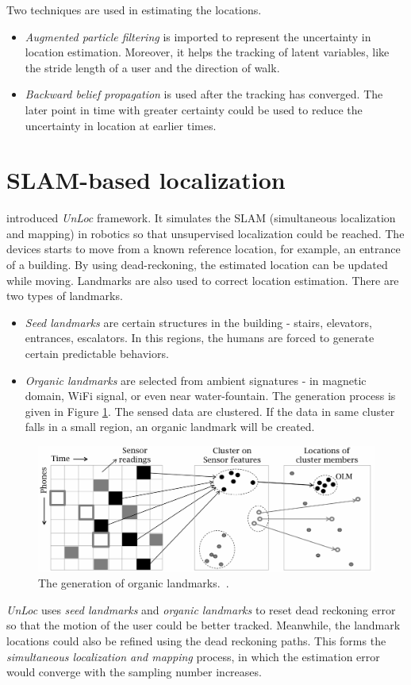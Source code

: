 \documentclass[letterpaper]{article}
\begin{document}
Two techniques are used in estimating the locations.
\begin{itemize}
\item \emph{Augmented particle filtering} is imported to represent the uncertainty in location estimation.
Moreover, it helps the tracking of latent variables, like the stride length of a user and the direction of walk.
\item \emph{Backward belief propagation} is used after the tracking has converged.
The later point in time with greater certainty could be used to reduce the uncertainty in location at earlier times.
\end{itemize}


\section{SLAM-based localization}

\cite{Wang:2012:NNW:2307636.2307655} introduced \emph{UnLoc} framework.
It simulates the SLAM (simultaneous localization and mapping) in robotics so that unsupervised localization could be reached.
The devices starts to move from a known reference location, for example, an entrance of a building.
By using dead-reckoning, the estimated location can be updated while moving.
Landmarks are also used to correct location estimation.
There are two types of landmarks.
\begin{itemize}
	\item \emph{Seed landmarks} are certain structures in the building - stairs, elevators, entrances, escalators.
	In this regions, the humans are forced to generate certain predictable behaviors.
	\item \emph{Organic landmarks} are selected from ambient signatures - in magnetic domain, WiFi signal, or even near water-fountain.
	The generation process is given in Figure \ref{fig:olm}.
	The sensed data are clustered.
	If the data in same cluster falls in a small region, an organic landmark will be created.
\end{itemize}
\begin{figure}
	\centering
	\includegraphics[width=0.9\linewidth]{fig/OLM.png}
	\caption{The generation of organic landmarks.~\cite{Wang:2012:NNW:2307636.2307655}.}
	\label{fig:olm}
\end{figure}
\emph{UnLoc} uses \emph{seed landmarks} and \emph{organic landmarks} to reset dead reckoning error so that the motion of the user could be better tracked.
Meanwhile, the landmark locations could also be refined using the dead reckoning paths. 
This forms the \emph{simultaneous localization and mapping} process, in which the estimation error would converge with the sampling number increases.
\end{document}
